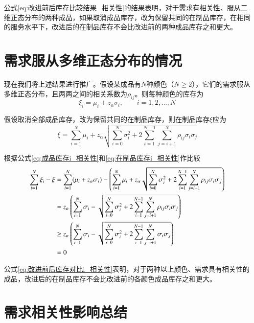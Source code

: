 公式\ref{eq:改进前后库存比较结果_相关性}的结果表明，对于需求有相关性、服从二维正态分布的两种成品，如果取消成品库存，改为保留共同的在制品库存，在相同的服务水平下，改进后的在制品库存不会比改进前的两种成品库存之和更大。







\section{需求服从多维正态分布的情况}

现在我们将上述结果进行推广。假设某成品有$N$种颜色（$N\geq 2$），它们的需求服从多维正态分布，且两两之间的相关系数为$\rho_{ij}$。则每种颜色的库存为
\begin{equation}
\xi_i = \mu_i + z_\alpha\sigma_i,\qquad i=1,2,\ldots,N
\label{eq:成品库存i_相关性}
\end{equation}

假设取消全部成品库存，改为保留共同的在制品库存，则在制品库存$\xi$应为
\begin{equation}
\xi = \sum_{i=1}^N\mu_i + z_\alpha\sqrt{\sum_{i=0}^N\sigma_i^2 + 2\sum_{i=1}^{N-1}\sum_{j=i+1}^N\rho_{ij}\sigma_i\sigma_j}
\label{eq:在制品库存i_相关性}
\end{equation}

根据公式\ref{eq:成品库存i_相关性}和\ref{eq:在制品库存i_相关性}作比较
\begin{align}
\sum_{i=1}^N\xi_i - \xi &= \sum_{i=1}^N(\mu_i+z_\alpha\sigma_i) - \left(\sum_{i=1}^N\mu_i + z_\alpha\sqrt{\sum_{i=0}^N\sigma_i^2 + 2\sum_{i=1}^{N-1}\sum_{j=i+1}^N\rho_{ij}\sigma_i\sigma_j}\right) \notag\\
&= z_\alpha\left(\sum_{i=1}^N\sigma_i-\sqrt{\sum_{i=0}^N\sigma_i^2 + 2\sum_{i=1}^{N-1}\sum_{j=i+1}^N\rho_{ij}\sigma_i\sigma_j}\right) \notag\\
&\geq z_\alpha\left(\sum_{i=1}^N\sigma_i-\sqrt{\sum_{i=0}^N\sigma_i^2 + 2\sum_{i=1}^{N-1}\sum_{j=i+1}^N\sigma_i\sigma_j}\right) \notag\\
& = 0
\label{eq:改进前后库存对比i_相关性}
\end{align}

公式\ref{eq:改进前后库存对比i_相关性}表明，对于两种以上颜色、需求具有相关性的成品，改进后的在制品库存不会比改进前的各颜色成品库存之和更大。









\section{需求相关性影响总结}

